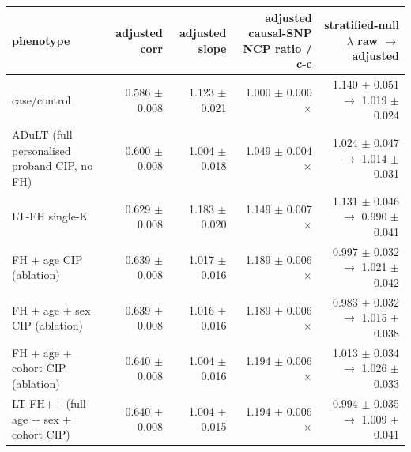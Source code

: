 \begin{tabular}{lrrrr}
\toprule
phenotype & adjusted corr & adjusted slope & adjusted causal-SNP NCP ratio / c-c & stratified-null $\lambda$ raw $\to$ adjusted \\
\midrule
case/control & 0.586 $\pm$ 0.008 & 1.123 $\pm$ 0.021 & 1.000 $\pm$ 0.000$\times$ & 1.140 $\pm$ 0.051 $\to$ 1.019 $\pm$ 0.024 \\
ADuLT (full personalised proband CIP, no FH) & 0.600 $\pm$ 0.008 & 1.004 $\pm$ 0.018 & 1.049 $\pm$ 0.004$\times$ & 1.024 $\pm$ 0.047 $\to$ 1.014 $\pm$ 0.031 \\
LT-FH single-K & 0.629 $\pm$ 0.008 & 1.183 $\pm$ 0.020 & 1.149 $\pm$ 0.007$\times$ & 1.131 $\pm$ 0.046 $\to$ 0.990 $\pm$ 0.041 \\
FH + age CIP (ablation) & 0.639 $\pm$ 0.008 & 1.017 $\pm$ 0.016 & 1.189 $\pm$ 0.006$\times$ & 0.997 $\pm$ 0.032 $\to$ 1.021 $\pm$ 0.042 \\
FH + age + sex CIP (ablation) & 0.639 $\pm$ 0.008 & 1.016 $\pm$ 0.016 & 1.189 $\pm$ 0.006$\times$ & 0.983 $\pm$ 0.032 $\to$ 1.015 $\pm$ 0.038 \\
FH + age + cohort CIP (ablation) & 0.640 $\pm$ 0.008 & 1.004 $\pm$ 0.016 & 1.194 $\pm$ 0.006$\times$ & 1.013 $\pm$ 0.034 $\to$ 1.026 $\pm$ 0.033 \\
LT-FH++ (full age + sex + cohort CIP) & 0.640 $\pm$ 0.008 & 1.004 $\pm$ 0.015 & 1.194 $\pm$ 0.006$\times$ & 0.994 $\pm$ 0.035 $\to$ 1.009 $\pm$ 0.041 \\
\bottomrule
\end{tabular}
